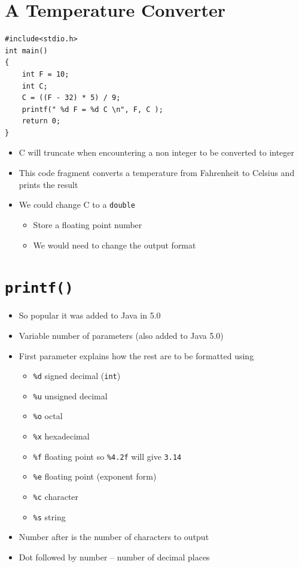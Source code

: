 \documentclass{article}
\begin{document}
\section{A Temperature Converter}
\begin{verbatim}
#include<stdio.h>
int main()
{
	int F = 10; 
	int C;
	C = ((F - 32) * 5) / 9;
	printf(" %d F = %d C \n", F, C );
	return 0;
}
\end{verbatim}

\begin{itemize}
\item C will truncate when encountering a non integer to be converted to integer
\item This code fragment converts a temperature from Fahrenheit to Celsius and prints the result
\item We could change C to a \verb!double!
\begin{itemize}
\item Store a floating point number
\item We would need to change the output format
\end{itemize}
\end{itemize}


\newpage
\section{\texttt{printf()}}
\begin{itemize}
\item So popular it was added to Java in 5.0
\item Variable number of parameters (also added to Java 5.0)
\item First parameter explains how the rest are to be formatted using
\begin{itemize}
\item \verb!%d! signed decimal (\verb!int!)
\item \verb!%u! unsigned decimal
\item \verb!%o! octal
\item \verb!%x! hexadecimal
\item \verb!%f! floating point so \verb!%4.2f! will give \verb!3.14!
\item \verb!%e! floating point (exponent form)
\item \verb!%c! character
\item \verb!%s! string
\end{itemize}
\item Number after is the number of characters to output
\item Dot followed by number -- number of decimal places
\end{itemize}
\end{document}
